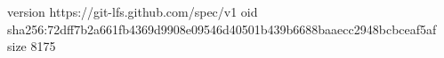 version https://git-lfs.github.com/spec/v1
oid sha256:72dff7b2a661fb4369d9908e09546d40501b439b6688baaecc2948bcbceaf5af
size 8175
